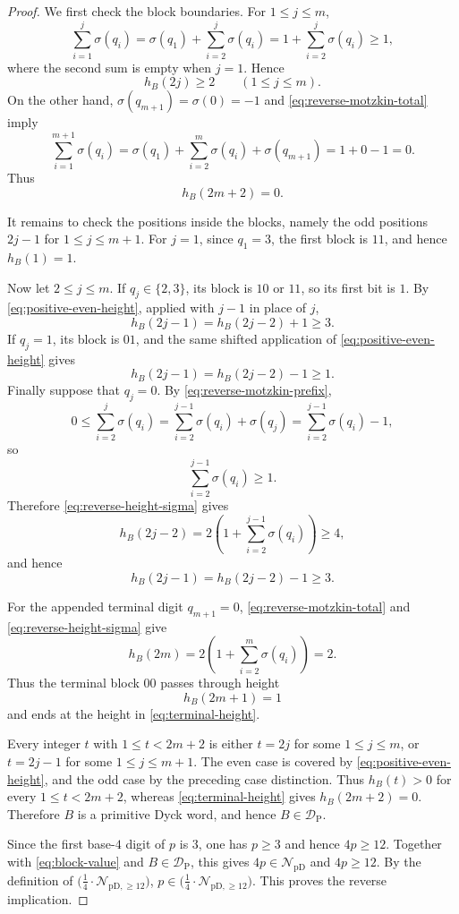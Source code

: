 \documentclass[12pt]{article}
\theoremstyle{plain}
\theoremstyle{definition}
\theoremstyle{plain}
\newcommand{\NpD}{\mathcal{N}_{\mathrm{pD}}}
\newcommand{\DP}{\mathcal{D}_{\mathrm{P}}}
\newcommand{\Pset}{%
  \bigl(\tfrac{1}{4}\cdot\mathcal{N}_{\mathrm{pD},\geq 12}\bigr)%
}
\begin{document}
\begin{proof}
We first check the block boundaries.  For $1\leq j\leq m$,
\[
 \sum_{i=1}^{j}\sigma(q_i)
 =\sigma(q_1)+\sum_{i=2}^{j}\sigma(q_i)
 =1+\sum_{i=2}^{j}\sigma(q_i)
 \geq1,
\]
where the second sum is empty when $j=1$.  Hence
\begin{equation}\label{eq:positive-even-height}
 h_B(2j)\geq2
 \qquad(1\leq j\leq m).
\end{equation}
On the other hand, $\sigma(q_{m+1})=\sigma(0)=-1$ and
\eqref{eq:reverse-motzkin-total} imply
\[
 \sum_{i=1}^{m+1}\sigma(q_i)
 =\sigma(q_1)+\sum_{i=2}^{m}\sigma(q_i)+\sigma(q_{m+1})
 =1+0-1=0.
\]
Thus
\begin{equation}\label{eq:terminal-height}
 h_B(2m+2)=0.
\end{equation}

It remains to check the positions inside the blocks, namely the odd positions
$2j-1$ for $1\leq j\leq m+1$.  For $j=1$, since $q_1=3$, the first block
is $11$, and hence $h_B(1)=1$.

Now let $2\leq j\leq m$.  If $q_j\in\{2,3\}$, its block is $10$ or $11$,
so its first bit is $1$.  By \eqref{eq:positive-even-height}, applied with
$j-1$ in place of $j$,
\[
 h_B(2j-1)=h_B(2j-2)+1\geq3.
\]
If $q_j=1$, its block is $01$, and the same shifted application of
\eqref{eq:positive-even-height} gives
\[
 h_B(2j-1)=h_B(2j-2)-1\geq1.
\]
Finally suppose that $q_j=0$.  By \eqref{eq:reverse-motzkin-prefix},
\[
 0\leq\sum_{i=2}^{j}\sigma(q_i)
 =\sum_{i=2}^{j-1}\sigma(q_i)+\sigma(q_j)
 =\sum_{i=2}^{j-1}\sigma(q_i)-1,
\]
so
\[
 \sum_{i=2}^{j-1}\sigma(q_i)\geq1.
\]
Therefore \eqref{eq:reverse-height-sigma} gives
\[
 h_B(2j-2)
 =2\left(1+\sum_{i=2}^{j-1}\sigma(q_i)\right)
 \geq4,
\]
and hence
\[
 h_B(2j-1)=h_B(2j-2)-1\geq3.
\]

For the appended terminal digit $q_{m+1}=0$,
\eqref{eq:reverse-motzkin-total} and
\eqref{eq:reverse-height-sigma} give
\[
 h_B(2m)=2\left(1+\sum_{i=2}^{m}\sigma(q_i)\right)=2.
\]
Thus the terminal block $00$ passes through height
\[
 h_B(2m+1)=1
\]
and ends at the height in \eqref{eq:terminal-height}.

Every integer $t$ with $1\leq t<2m+2$ is either $t=2j$ for some
$1\leq j\leq m$, or $t=2j-1$ for some $1\leq j\leq m+1$.
The even case is covered by \eqref{eq:positive-even-height}, and the odd
case by the preceding case distinction.  Thus $h_B(t)>0$ for every
$1\leq t<2m+2$, whereas \eqref{eq:terminal-height} gives
$h_B(2m+2)=0$.  Therefore $B$ is a primitive Dyck word, and hence
$B\in\DP$.

Since the first base-$4$ digit of $p$ is $3$, one has $p\geq3$ and hence
$4p\geq12$.  Together with \eqref{eq:block-value} and $B\in\DP$, this gives
$4p\in\NpD$ and $4p\geq12$.  By the definition of $\Pset$, $p\in\Pset$.
This proves the reverse implication.
\end{proof}
\end{document}
